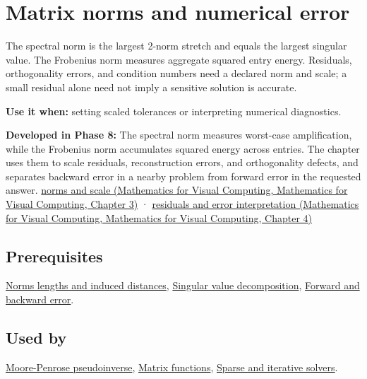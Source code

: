 \hypertarget{appendix-f8657bac66e5}{}\label{referencestart:appendix-f8657bac66e5}
\section{Matrix norms and numerical error}\label{appendix-f8657bac66e5-matrix-norms-and-numerical-error}

The spectral norm is the largest 2-norm stretch and equals the largest singular value. The Frobenius norm measures aggregate squared entry energy. Residuals, orthogonality errors, and condition numbers need a declared norm and scale; a small residual alone need not imply a sensitive solution is accurate.

\textbf{Use it when:} setting scaled tolerances or interpreting numerical diagnostics.

\textbf{Developed in Phase 8:} The spectral norm measures worst-case amplification, while the Frobenius norm accumulates squared energy across entries. The chapter uses them to scale residuals, reconstruction errors, and orthogonality defects, and separates backward error in a nearby problem from forward error in the requested answer. \href{../02-Mathematics-for-Visual-Computing/main.pdf\#nameddest=01-foundations-i-ch019-matrix-norms-put-scale-into-error-statements}{norms and scale (Mathematics for Visual Computing, Mathematics for Visual Computing, Chapter 3)} · \href{../02-Mathematics-for-Visual-Computing/main.pdf\#nameddest=01-foundations-i-ch020-residuals-distinguish-backward-accuracy-from-forward-certainty}{residuals and error interpretation (Mathematics for Visual Computing, Mathematics for Visual Computing, Chapter 4)}

\subsection{Prerequisites}\label{appendix-f8657bac66e5-prerequisites}

\hyperref[appendix-49933872bb51]{Norms lengths and induced distances}, \hyperref[appendix-1fad5e7f36fa]{Singular value decomposition}, \hyperref[appendix-a7fbaf6d1b1c]{Forward and backward error}.

\subsection{Used by}\label{appendix-f8657bac66e5-used-by}

\hyperref[appendix-541306fdbc1b]{Moore-Penrose pseudoinverse}, \hyperref[appendix-0f4bc2bf2b1f]{Matrix functions}, \hyperref[appendix-67c87a3d9e94]{Sparse and iterative solvers}.

